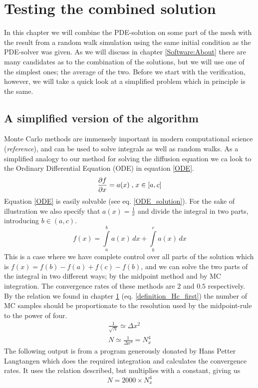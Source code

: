 \section{Testing the combined solution}
In this chapter we will combine the PDE-solution on some part of the mesh with the result from a random walk simulation using the same initial condition as the PDE-solver was given. 
As we will discuss in chapter \ref{Software:About} there are many candidates as to the combination of the solutions, but we will use one of the simplest ones; the average of the two. 
Before we start with the verification, however, we will take a quick look at a simplified problem which in principle is the same.

\subsection{A simplified version of the algorithm}\label{simplified_test}

Monte Carlo methods are immensely important in modern computational science (\emph{reference}), and can be used to solve integrals as well as random walks. 
As a simplified analogy to our method for solving the diffusion equation we ca look to the Ordinary Differential Equation (ODE) in equation \ref{ODE}. 
\begin{equation}\label{ODE}
 \frac{\partial f}{\partial x} = a(x)\;\text{,}\; x\in [a,c]
\end{equation}
Equation \ref{ODE} is easily solvable (see eq. \ref{ODE_solution}). For the sake of illustration we also specify that $a(x) = \frac{1}{x}$ and divide the integral in two parts, introducing $b\in (a,c)$.
\begin{equation}\label{ODE_solution}
 f(x) = \int\limits_a^b a(x)\,dx + \int\limits_b^c a(x)\,dx
\end{equation}
This is a case where we have complete control over all parts of the solution which is $f(x) = f(b)-f(a) + f(c)-f(b)$, and we can solve the two parts of the integral in two different ways; by the midpoint method and by MC integration. The convergence rates of these methods are $2$ and $0.5$ respectively. 
By the relation we found in chapter \ref{} (eq. \eqref{definition_Hc_first}) the number of MC samples should be proportionate to the resolution used by the midpoint-rule to the power of four. 
\begin{align*}
 \frac{1}{\sqrt{N}} \simeq \Delta x^2 \\
 N \simeq \frac{1}{\Delta x^4} = N_x^4
\end{align*}
The following output is from a program generously donated by Hans Petter Langtangen which does the required integration and calculates the convergence rates. 
It uses the relation described, but multiplies with a constant, giving us 
\begin{equation}\label{num_walkers_MC_integration}
 N = 2000\times N_x^4
\end{equation}

